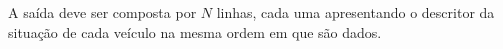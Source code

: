 A saída deve ser composta por $N$ linhas, cada uma apresentando o descritor da situação de cada veículo na mesma ordem em que são dados.
